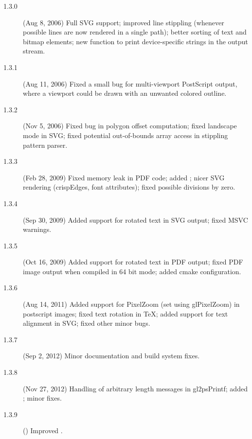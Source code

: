 \begin{description}
\item[1.3.0] (Aug 8, 2006) Full SVG support; improved line stippling
  (whenever possible lines are now rendered in a single path); better
  sorting of text and bitmap elements; new function 
  to print device-specific strings in the output stream.
\item[1.3.1] (Aug 11, 2006) Fixed a small bug for multi-viewport
  PostScript output, where a viewport could be drawn with an unwanted
  colored outline.
\item[1.3.2] (Nov 5, 2006) Fixed bug in polygon offset computation;
  fixed landscape mode in SVG; fixed potential out-of-bounds array
  access in stippling pattern parser.
\item[1.3.3] (Feb 28, 2009) Fixed memory leak in PDF code; added
  ; nicer SVG rendering (crispEdges, font attributes);
  fixed possible divisions by zero.
\item[1.3.4] (Sep 30, 2009) Added support for rotated text in SVG output;
  fixed MSVC warnings.
\item[1.3.5] (Oct 16, 2009) Added support for rotated text in PDF output;
  fixed PDF image output when compiled in 64 bit mode; added cmake
  configuration.
\item[1.3.6] (Aug 14, 2011) Added support for PixelZoom (set using
  glPixelZoom) in postscript images; fixed text rotation in TeX; added
  support for text alignment in SVG; fixed other minor bugs.
\item[1.3.7] (Sep 2, 2012) Minor documentation and build system fixes.
\item[1.3.8] (Nov 27, 2012) Handling of arbitrary length messages in
  gl2psPrintf; added ; minor fixes.
\item[1.3.9] () Improved .
\end{description}



